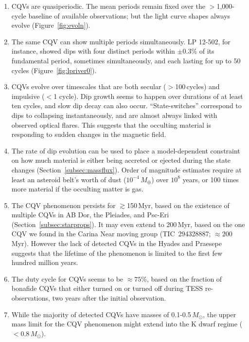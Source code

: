 \documentclass[11pt,twocolumn,tighten]{aastex63}
\begin{document}
\begin{enumerate}[leftmargin=*]
  \item CQVs are quasiperiodic.  The mean periods remain fixed over
    the $>$1{,}000-cycle baseline of available observations; but the
    light curve shapes always evolve (Figure~\ref{fig:evoln}).
  \item The same CQV can show multiple periods simultaneously.  LP
    12-502, for instance, showed dips with four distinct periods
    within $\pm 0.3\%$ of its fundamental period, sometimes
    simultaneously, and each lasting for up to 50 cycles
    (Figure~\ref{fig:lpriver0}).
    \item CQVs evolve over timescales that are both secular
      ($>$100\,cycles) and impulsive ($<$1 cycle).  Dip growth seems
      to happen over durations of at least ten cycles, and slow dip
      decay can also occur.  ``State-switches'' correspond to dips to
      collapsing instantaneously, and are almost always linked with
      observed optical flares.  This suggests that the occulting
      material is responding to sudden changes in the magnetic field.
    \item The rate of dip evolution can be used to place a
      model-dependent constraint on how much material is either being
      accreted or ejected during the state changes
      (Section~\ref{subsec:massflux}).  Order of magnitude estimates
      require at least an asteroid belt's worth of dust
      ($10^{-4}$\,$M_\oplus$) over $10^8$ years, or 100 times more
      material if the occulting matter is gas.
  \item The CQV phenomenon persists for $\gtrsim$150\,Myr, based on
    the existence of multiple CQVs in AB Dor, the Pleiades, and
    Psc-Eri (Section~\ref{subsec:starprops}).  It may even extend to
    200\,Myr, based on the one CQV we found in the Carina Near moving
    group (TIC~294328887; $\approx$200\,Myr).  However the lack of
    detected CQVs in the Hyades and Praesepe suggests that the
    lifetime of the phenomenon is limited to the first few hundred
    million years.
    \item The duty cycle for CQVs seems to be $\approx$$75$\%, based
      on the fraction of bonafide CQVs that either turned on or turned
      off during TESS re-observations, two years after the initial
      observation.
    \item While the majority of detected CQVs have masses of
      0.1-0.5\,$M_\odot$, the upper mass limit for the CQV phenomenon
      might extend into the K dwarf regime ($<$$0.8$\,$M_\odot$).

\end{enumerate}
\end{document}
